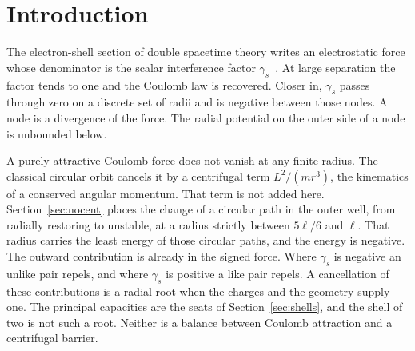 \documentclass[a4paper]{article}
\begin{document}
\section{Introduction}

The electron-shell section of double spacetime theory writes an electrostatic force whose denominator is the scalar interference factor \(\gamma_s\)~\cite{dst-main}. At large separation the factor tends to one and the Coulomb law is recovered. Closer in, \(\gamma_s\) passes through zero on a discrete set of radii and is negative between those nodes. A node is a divergence of the force. The radial potential on the outer side of a node is unbounded below.

A purely attractive Coulomb force does not vanish at any finite radius. The classical circular orbit cancels it by a centrifugal term \(L^{2}/(m r^{3})\), the kinematics of a conserved angular momentum. That term is not added here. Section~\ref{sec:nocent} places the change of a circular path in the outer well, from radially restoring to unstable, at a radius strictly between \(5\ell/6\) and \(\ell\). That radius carries the least energy of those circular paths, and the energy is negative. The outward contribution is already in the signed force. Where \(\gamma_s\) is negative an unlike pair repels, and where \(\gamma_s\) is positive a like pair repels. A cancellation of these contributions is a radial root when the charges and the geometry supply one. The principal capacities are the seats of Section~\ref{sec:shells}, and the shell of two is not such a root. Neither is a balance between Coulomb attraction and a centrifugal barrier.
\end{document}
